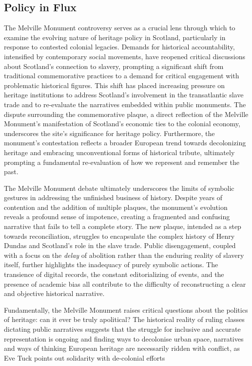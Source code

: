 \documentclass{scrartcl}
\begin{document}
\subsection{Policy in Flux}
The Melville Monument controversy serves as a crucial lens through which to examine the evolving nature of heritage policy in Scotland, particularly in response to contested colonial legacies. Demands for historical accountability, intensified by contemporary social movements, have reopened critical discussions about Scotland's connection to slavery, prompting a significant shift from traditional commemorative practices to a demand for critical engagement with problematic historical figures. This shift has placed increasing pressure on heritage institutions to address Scotland's involvement in the transatlantic slave trade and to re-evaluate the narratives embedded within public monuments. The dispute surrounding the commemorative plaque, a direct reflection of the Melville Monument's manifestation of Scotland's economic ties to the colonial economy, underscores the site's significance for heritage policy. Furthermore, the monument's contestation reflects a broader European trend towards decolonizing heritage and embracing unconventional forms of historical tribute, ultimately prompting a fundamental re-evaluation of how we represent and remember the past.

The Melville Monument debate ultimately underscores the limits of symbolic gestures in addressing the unfinished business of history. Despite years of contention and the addition of multiple plaques, the monument's evolution reveals a profound sense of impotence, creating a fragmented and confusing narrative that fails to tell a complete story. The new plaque, intended as a step towards reconciliation, struggles to encapsulate the complex history of Henry Dundas and Scotland's role in the slave trade. Public disengagement, coupled with a focus on the \textit{delay} of abolition rather than the enduring reality of slavery itself, further highlights the inadequacy of purely symbolic actions. The transience of digital records, the constant editorializing of events, and the presence of academic bias all contribute to the difficulty of reconstructing a clear and objective historical narrative. 

Fundamentally, the Melville Monument raises critical questions about the politics of heritage: can it ever be truly apolitical? The historical reality of ruling classes dictating public narratives suggests that the struggle for inclusive and accurate representation is ongoing and finding ways to decolonise urban space, narratives and ways of thinking European heritage are necessarily ridden with conflict, as Eve Tuck points out solidarity with de-colonial efforts 
\end{document}
